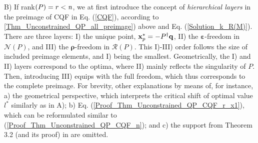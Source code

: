 \documentclass{imaman}
\newcommand{\bfx}{{\bf x}}
\newcommand{\bfq}{{\bf q}}
\newcommand{\bfrho}{{\boldsymbol \rho}}
\newcommand{\bfvarepsilon}{{\boldsymbol \varepsilon}}
\newcommand{\calN}{{\mathcal N}}
\newcommand{\calR}{{\mathcal R}}
\newcommand{\itn}{{\it n}}
\numberwithin{equation}{section}
\begin{document}
\noindent B) If rank$(P)=r<\itn$, we at first introduce the concept of \textit{hierarchical layers} in the preimage of CQF in Eq. (\ref{CQF}), according to \ref{Thm_Unconstrained_QP_all_preimage}) above and Eq. (\ref{Solution_k_R(M)}). There are three layers: I) the unique point, $\bfx_p^*=-P^\dagger\bfq$, II) the $\bfvarepsilon$-freedom in $\calN(P)$, and III) the $\bfrho$-freedom in $\calR(P)$. This I)-III) order follows the size of included preimage elements, and I) being the smallest. Geometrically, the I) and II) layers correspond to the optima, where II) mainly reflects the singularity of $P$. Then, introducing III) equips with the full freedom, which thus corresponds to the complete preimage. For brevity, other explanations by means of, for instance, a) the geometrical perspective, which interprets the critical shift of optimal value $l^*$ similarly as in A); b) Eq. (\ref{Proof_Thm_Unconstrained_QP_CQF_r_x1}), which can be reformulated similar to (\ref{Proof_Thm_Unconstrained_QP_CQF_n}); and c) the support from Theorem 3.2 (and its proof) in \cite{LiLiHs:20} are omitted.
\end{document}
